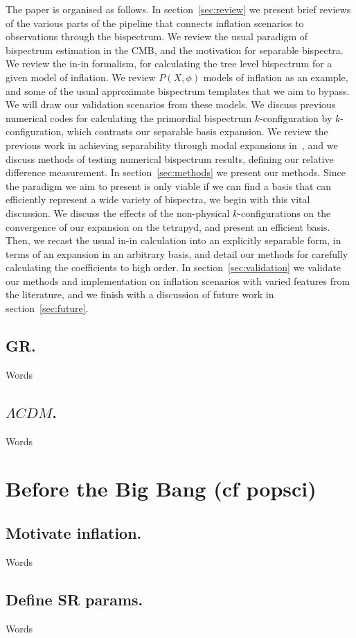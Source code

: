 The paper is organised as follows. In section~\ref{sec:review} we present brief reviews
of the various parts of the pipeline that connects inflation scenarios to observations
through the bispectrum.
We review the usual paradigm of bispectrum estimation in the CMB,
and the motivation for separable bispectra. We review the in-in formalism,
for calculating the tree level bispectrum for a given model of inflation.
We review $P(X,\phi)$ models of inflation as an example, and
some of the usual approximate bispectrum templates
that we aim to bypass.
We will draw our validation scenarios from these models.
We discuss previous numerical codes for
calculating the primordial bispectrum $k$-configuration by $k$-configuration,
which contrasts our separable basis expansion.
We review the previous work in achieving separability through modal expansions
in~\cite{Funakoshi},
and we discuss methods of testing
numerical bispectrum results, defining our relative difference measurement.
In section~\ref{sec:methods} we present our methods.
Since the paradigm we aim to present is only viable if we can find a basis
that can efficiently represent a wide variety of bispectra,
we begin with this vital discussion. We discuss the effects of the
non-physical $k$-configurations on the convergence of our expansion on
the tetrapyd, and present an efficient basis.
Then, we recast the usual in-in calculation into an explicitly separable form,
in terms of an expansion in an arbitrary basis,
and detail our methods for carefully calculating the coefficients to high order.
In section~\ref{sec:validation} we validate our methods and implementation
on inflation scenarios with varied features from the literature,
and we finish with a discussion of future work in section~\ref{sec:future}.
    \subsection{GR.}
    Words
    \subsection{$\Lambda CDM$.}
    Words
\section{Before the Big Bang (cf popsci)}
    \subsection{Motivate inflation.}
    Words
    \subsection{Define SR params.}
    Words
